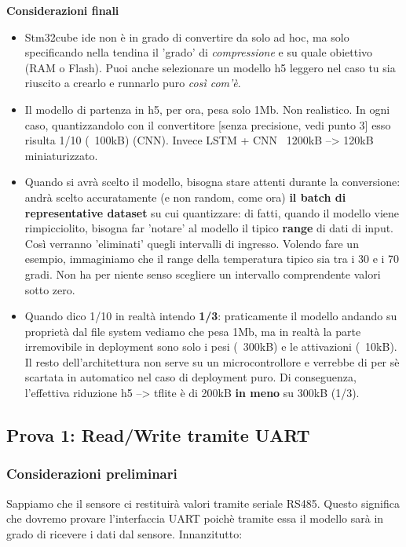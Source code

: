 \textbf{Considerazioni finali}
\begin{itemize}
    \item Stm32cube ide non è in grado di convertire da solo ad hoc, ma solo specificando nella tendina il 'grado' di \textit{compressione} e su quale obiettivo (RAM o Flash). Puoi anche selezionare un modello h5 leggero nel caso tu sia riuscito a crearlo e runnarlo puro \textit{così com'è}.  
    \item Il modello di partenza in h5, per ora, pesa solo 1Mb. Non realistico. In ogni caso, quantizzandolo con il convertitore [senza precisione, vedi punto 3] esso risulta 1/10 (~100kB) (CNN). Invece LSTM + CNN ~1200kB --> 120kB miniaturizzato. 
    \item Quando si avrà scelto il modello, bisogna stare attenti durante la conversione: andrà scelto accuratamente (e non random, come ora) \textbf{il batch di representative dataset} su cui quantizzare: di fatti, quando il modello viene rimpicciolito, bisogna far 'notare' al modello il tipico \textbf{range} di dati di input. Così verranno 'eliminati' quegli intervalli di ingresso. Volendo fare un esempio, immaginiamo che il range della temperatura tipico sia tra i 30 e i 70 gradi. Non ha per niente senso scegliere un intervallo comprendente valori sotto zero.
    \item Quando dico 1/10 in realtà intendo \textbf{1/3}: praticamente il modello andando su proprietà dal file system vediamo che pesa 1Mb, ma in realtà la parte irremovibile in deployment sono solo i pesi (~300kB) e le attivazioni (~10kB). Il resto dell'architettura non serve su un microcontrollore e verrebbe di per sè scartata in automatico nel caso di deployment puro. Di conseguenza, l'effettiva riduzione h5 --> tflite è di 200kB \textbf{in meno} su 300kB (1/3). 
\end{itemize}

\subsection{Prova 1: Read/Write tramite UART}

\subsubsection{Considerazioni preliminari}

Sappiamo che il sensore ci restituirà valori tramite seriale RS485. Questo significa che dovremo provare l'interfaccia UART poichè tramite essa il modello sarà in grado di ricevere i dati dal sensore. Innanzitutto: 

